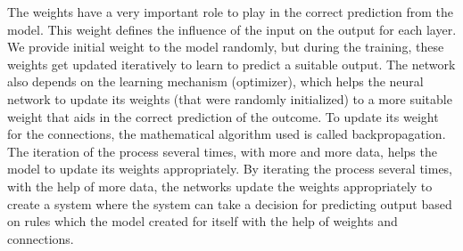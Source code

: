  The weights have a very important role to play in the correct prediction from the model. This weight defines the influence of the input on the output for each layer. We provide initial weight to the model randomly, but during the training, these weights get updated iteratively to learn to predict a suitable output.
 The network also depends on the learning mechanism (optimizer)\cite{https://doi.org/10.48550/arxiv.1912.08957}, which helps the neural network to update its weights (that were randomly initialized) to a more suitable weight that aids in the correct prediction of the outcome.  To update its weight for the connections, the mathematical algorithm used is called backpropagation\cite{118638}. The iteration of the process several times, with more and more data, helps the model to update its weights appropriately. By iterating the process several times, with the help of more data, the networks update the weights appropriately to create a system where the system can take a decision for predicting output based on rules which the model created for itself with the help of weights and connections.\\


